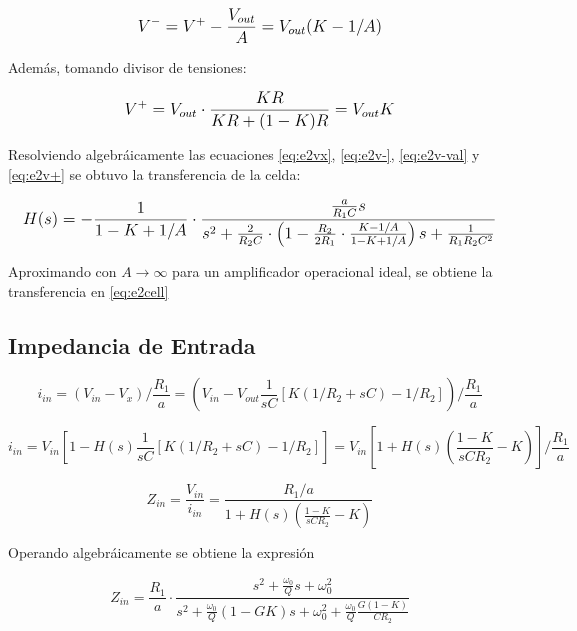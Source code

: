 {\begin{equation}
\mathlarger{
V^-=V^+ - \frac{V_{out}}{A} = V_{out} (K - 1/A)
}
\label{eq:e2v-val}
\end{equation}

Además, tomando divisor de tensiones:

\begin{equation}
\mathlarger{
V^+=V_{out}\cdot\frac{KR}{KR+(1-K)R}=V_{out}K
}
\label{eq:e2v+}
\end{equation}

Resolviendo algebráicamente las ecuaciones \eqref{eq:e2vx}, \eqref{eq:e2v-}, \eqref{eq:e2v-val} y \eqref{eq:e2v+} se obtuvo la transferencia de la celda:

\begin{equation}
\mathlarger{
H(s)=-\frac{1}{1-K+1/A} \cdot \frac{\frac{a}{R_1C}s}{s^2 + \frac{2}{R_2 C}\cdot \left(1-\frac{R_2}{2 R_1}\cdot \frac{K-1/A}{1-K+1/A} \right)s + \frac{1}{R_1R_2C^2}}
}
\label{eq:e2 cell avol}
\end{equation}

Aproximando con $A\rightarrow \infty$ para un amplificador operacional ideal, se obtiene la transferencia en \eqref{eq:e2cell}

\subsection{Impedancia de Entrada}

\begin{equation}
i_{in} = \left(V_{in} - V_x \right) / \frac{R_1}{a} = \left( V_{in} - V_{out} \frac{1}{sC} \left[ K(1/R_2 + sC) - 1/R_2 \right]\right)/\frac{R_1}{a}
\end{equation}

\begin{equation*}
i_{in} = V_{in} \left[1- H(s) \frac{1}{sC} \left[ K(1/R_2+sC) - 1/R_2 \right] \right]=V_{in} \left[1+ H(s) \left(\frac{1-K}{sCR_2} - K \right) \right]/\frac{R_1}{a}
\end{equation*}

\begin{equation}
Z_{in} = \frac{V_{in}}{i_{in}}= \frac{R_1/a}{1+H(s) \left(\frac{1-K}{sCR_2} - K \right)}
\end{equation}

Operando algebráicamente se obtiene la expresión

\begin{equation*}
Z_{in} = \frac{R_1}{a} \cdot \frac{s^2 + \frac{\omega_0}{Q}s + \omega_0^2}{s^2 + \frac{\omega_0}{Q}(1-GK) s + \omega_0^2 + \frac{\omega_0}{Q} \frac{G(1-K)}{C R_2}}
\end{equation*}

}
